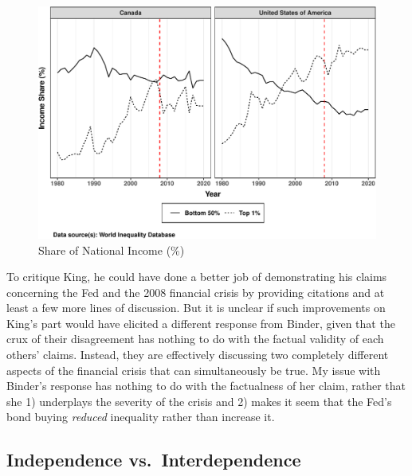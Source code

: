 \documentclass[
  12pt,
]{article}
\begin{document}
\begin{figure}[ht]

{\centering \includegraphics{fed-paper_files/figure-latex/income_dist1-1} 

}

\caption{\label{income_dist1}Share of National Income (\%)}\label{fig:income_dist1}
\end{figure}

To critique King, he could have done a better job of demonstrating his
claims concerning the Fed and the 2008 financial crisis by providing
citations and at least a few more lines of discussion. But it is unclear
if such improvements on King's part would have elicited a different
response from Binder, given that the crux of their disagreement has
nothing to do with the factual validity of each others' claims. Instead,
they are effectively discussing two completely different aspects of the
financial crisis that can simultaneously be true. My issue with Binder's
response has nothing to do with the factualness of her claim, rather
that she 1) underplays the severity of the crisis and 2) makes it seem
that the Fed's bond buying \emph{reduced} inequality rather than
increase it.

\hypertarget{independence-vs.-interdependence}{%
\subsection{Independence
vs.~Interdependence}\label{independence-vs.-interdependence}}
\end{document}
